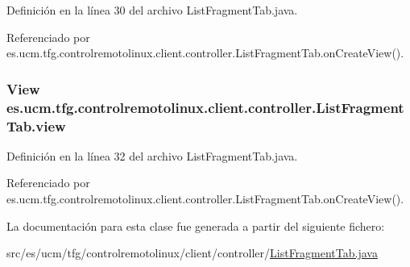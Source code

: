 Definición en la línea 30 del archivo List\-Fragment\-Tab.\-java.



Referenciado por es.\-ucm.\-tfg.\-controlremotolinux.\-client.\-controller.\-List\-Fragment\-Tab.\-on\-Create\-View().

\hypertarget{classes_1_1ucm_1_1tfg_1_1controlremotolinux_1_1client_1_1controller_1_1ListFragmentTab_a5f74d138ac1ed74151d7d7bc926520c7}{
\subsubsection[{view}]{\setlength{\rightskip}{0pt plus 5cm}View es.\-ucm.\-tfg.\-controlremotolinux.\-client.\-controller.\-List\-Fragment\-Tab.\-view\hspace{0.3cm}{\ttfamily [private]}}}\label{classes_1_1ucm_1_1tfg_1_1controlremotolinux_1_1client_1_1controller_1_1ListFragmentTab_a5f74d138ac1ed74151d7d7bc926520c7}


Definición en la línea 32 del archivo List\-Fragment\-Tab.\-java.



Referenciado por es.\-ucm.\-tfg.\-controlremotolinux.\-client.\-controller.\-List\-Fragment\-Tab.\-on\-Create\-View().



La documentación para esta clase fue generada a partir del siguiente fichero\-:\begin{DoxyCompactItemize}
\item 
src/es/ucm/tfg/controlremotolinux/client/controller/\hyperlink{ListFragmentTab_8java}{List\-Fragment\-Tab.\-java}\end{DoxyCompactItemize}
